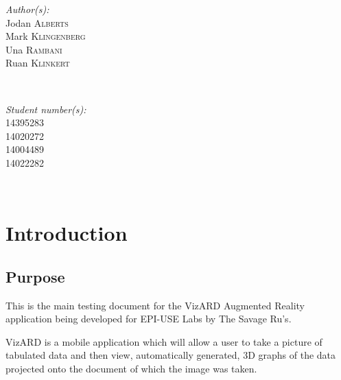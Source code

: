 \documentclass[a4paper,12pt]{article}
\begin{document}
\begin{titlepage}
\begin{minipage}{0.4\textwidth}
\begin{flushleft} \large
\emph{Author(s):}\\
Jodan \textsc{Alberts}\\ %
Mark \textsc{Klingenberg}\\
Una \textsc{Rambani}\\
Ruan \textsc{Klinkert}\\
\end{flushleft}
\end{minipage}
~
\begin{minipage}{0.4\textwidth}
\begin{flushright} \large
\emph{Student number(s):} \\
14395283\\ %
14020272\\
14004489\\
14022282\\

\end{flushright}
\end{minipage}\\[4cm]


 

\vfill %

\end{titlepage}

\newpage

\tableofcontents

\newpage

\section{Introduction}

\subsection{Purpose}
This is the main testing document for the VizARD Augmented Reality application being developed for EPI-USE Labs by The Savage Ru's.

VizARD is a mobile application which will allow a user to take a picture of tabulated data and then view, automatically generated, 3D graphs of the data projected onto the document of which the image was taken.
\end{document}
